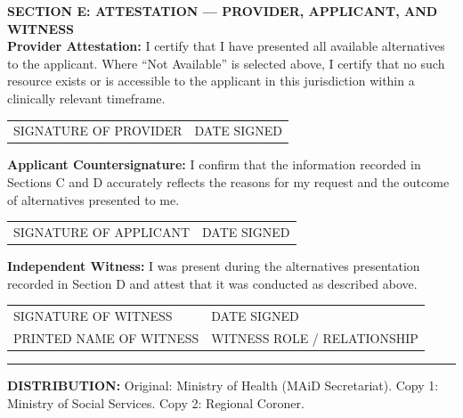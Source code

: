 \documentclass[11pt]{article}
\begin{document}
\vspace{1em}
\noindent\textbf{\large SECTION E: ATTESTATION --- PROVIDER, APPLICANT, AND WITNESS}\\[0.5em]
\noindent\textbf{Provider Attestation:} I certify that I have presented all available alternatives to the applicant. Where ``Not Available'' is selected above, I certify that no such resource exists or is accessible to the applicant in this jurisdiction within a clinically relevant timeframe.

\vspace{0.5em}
\noindent\begin{tabularx}{\textwidth}{X X}
SIGNATURE OF PROVIDER\hrulefill & DATE SIGNED\hrulefill \\
\end{tabularx}

\vspace{1em}
\noindent\textbf{Applicant Countersignature:} I confirm that the information recorded in Sections C and D accurately reflects the reasons for my request and the outcome of alternatives presented to me.

\vspace{0.5em}
\noindent\begin{tabularx}{\textwidth}{X X}
SIGNATURE OF APPLICANT\hrulefill & DATE SIGNED\hrulefill \\
\end{tabularx}

\vspace{1em}
\noindent\textbf{Independent Witness:} I was present during the alternatives presentation recorded in Section D and attest that it was conducted as described above.

\vspace{0.5em}
\noindent\begin{tabularx}{\textwidth}{X X}
SIGNATURE OF WITNESS\hrulefill & DATE SIGNED\hrulefill \\
PRINTED NAME OF WITNESS\hrulefill & WITNESS ROLE / RELATIONSHIP\hrulefill \\
\end{tabularx}

\vspace{2em}
\hrule
\vspace{0.5em}
\noindent\small\textbf{DISTRIBUTION:} Original: Ministry of Health (MAiD Secretariat). Copy 1: Ministry of Social Services. Copy 2: Regional Coroner.
\end{document}
